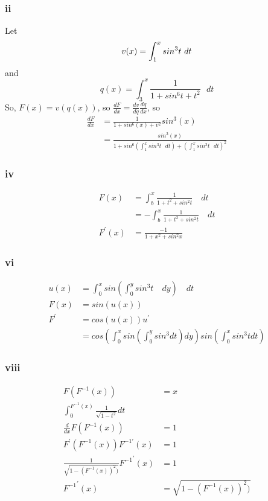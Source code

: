 \documentclass{article}
\begin{document}
\subsubsection*{ii}
Let 
\begin{equation*}
v(x) = \int_{1}^{x} sin^{3}t \text{ } dt\\
\end{equation*}
and 
\begin{equation*}
q(x) = \int_{3}^{x}\frac{1}{1+sin^{6}t + t^2} \text{ } dt
\end{equation*}
So, $F(x) = v(q(x))$, so $\frac{dF}{dx} = \frac{dv}{dq} \frac{dq}{dx}$, so 
\begin{align*}
\frac{dF}{dx} &= \frac{1}{1+sin^{6}(x) + v^{2}} sin^{3}(x)\\
&= \frac{sin^{3}(x)}{1+sin^{6}(\int_{1}^{x} sin^{3}t \text{ } dt) + (\int_{1}^{x} sin^{3}t \text{ } dt)^{2}}
\end{align*}
\subsubsection*{iv}
\begin{align*}
F(x) &= \int_{b}^{x} \frac{1}{1+t^{2} + sin^{2}t} \quad dt\\
&= -\int_{b}^{x} \frac{1}{1+t^{2} + sin^{2}t} \quad dt\\
F^{\prime}(x) &= \frac{-1}{1+x^{2}+sin^{2}x}
\end{align*}
\subsubsection*{vi}
\begin{align*}
u(x) &= \int_{0}^{x} sin(\int_{0}^{y}sin^{3}t \quad dy)\quad dt\\
F(x) &= sin(u(x))\\
F^{\prime} &= cos(u(x))u^{\prime}\\
&= cos(\int_{0}^{x}sin(\int_{0}^{y} sin^{3} dt)dy) sin(\int_{0}^{x}sin^{3}tdt)
\end{align*}

\subsubsection*{viii}
\begin{align*}
F(F^{-1}(x)) &= x\\
\int_{0}^{F^{-1}(x)} \frac{1}{\sqrt{1-t^{2}}} dt\\
\frac{d}{dx} F(F^{-1}(x)) &= 1\\
F^{\prime}(F^{-1}(x)) F^{-1 \prime}(x)&= 1\\
\frac{1}{\sqrt{1-(F^{-1}(x))^{2})}} {F^{-1}}^{ \prime}(x)&= 1\\
{F^{-1}}^{ \prime}(x) &= \sqrt{1-(F^{-1}(x))^{2})}
\end{align*}
\end{document}
